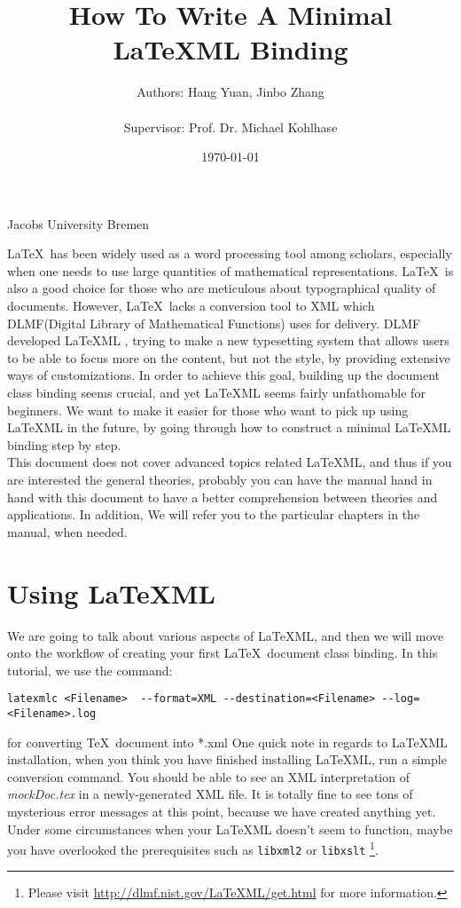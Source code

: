 \documentclass{article}
\title{\textbf{How To Write A Minimal \LaTeX ML Binding}}
\author{Authors: Hang Yuan, Jinbo Zhang \\ \\Supervisor: Prof. Dr. Michael Kohlhase}
\date{\today}
\begin{document}
\maketitle
\begin{center}
Jacobs University Bremen
\end{center}
\noindent\LaTeX\ has been widely used as a word processing tool among scholars, especially when one needs to use large quantities of mathematical representations. \LaTeX\ is also a good choice for those who are meticulous about typographical quality of documents. However, \LaTeX\ lacks a conversion tool to XML which DLMF(Digital Library of Mathematical Functions) uses for delivery. DLMF developed \LaTeX ML , trying to make a new typesetting system that allows users to be able to focus more on the content, but not the style, by providing extensive ways of customizations. In order to achieve this goal, building up the document class binding seems crucial, and yet \LaTeX ML seems fairly unfathomable for beginners. We want to make it easier for those who
want to pick up using \LaTeX ML in the future, by going through how to construct a minimal \LaTeX ML binding step by step. \\

\noindent This document does not cover advanced topics related \LaTeX ML, and thus if you are interested the general theories, probably you can have the manual hand in hand with this document to have a better comprehension between theories and applications. In addition, We will refer you to the particular chapters in the manual, when needed.

\section{Using LaTeXML}
We are going to talk about various aspects of \LaTeX ML, and then we will move onto the workflow of creating your first \LaTeX\ document class binding. In this tutorial, we use the command:

\begin{lstlisting}
latexmlc <Filename>  --format=XML --destination=<Filename> --log=<Filename>.log
\end{lstlisting}
for converting \TeX\ document into *.xml 
One quick note in regards to \LaTeX ML installation, when you think you have finished installing \LaTeX ML, run a simple conversion command. You should be able to see an XML interpretation of \textit{mockDoc.tex} in a newly-generated XML file. It is totally fine to see tons of mysterious 
error messages at this point, because we have created anything yet. Under some circumstances when your \LaTeX ML doesn't seem
to function, maybe you have overlooked the prerequisites such as \texttt{libxml2} or \texttt{libxslt} \footnote{Please visit \url{http://dlmf.nist.gov/LaTeXML/get.html} for more information.}. \\
\end{document}
